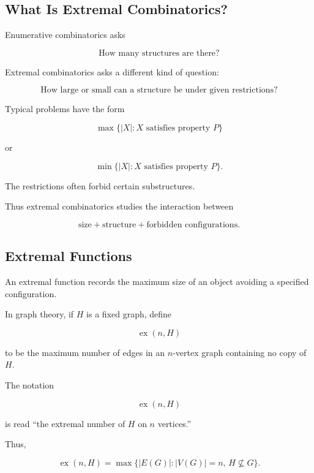 \subsection{What Is Extremal Combinatorics?}
\label{subsec:what-is-extremal-combinatorics}

Enumerative combinatorics asks

\[
\boxed{
\text{How many structures are there?}
}
\]

Extremal combinatorics asks a different kind of question:

\[
\boxed{
\text{How large or small can a structure be under given restrictions?}
}
\]

Typical problems have the form

\[
\boxed{
\max\{|X|:X\text{ satisfies property }P\}
}
\]

or

\[
\boxed{
\min\{|X|:X\text{ satisfies property }P\}.
}
\]

The restrictions often forbid certain substructures.

Thus extremal combinatorics studies the interaction between

\[
\boxed{
\text{size}
+
\text{structure}
+
\text{forbidden configurations}.
}
\]

\subsection{Extremal Functions}
\label{subsec:extremal-functions}

An extremal function records the maximum size of an object avoiding a
specified configuration.

In graph theory, if \(H\) is a fixed graph, define

\[
\boxed{
\operatorname{ex}(n,H)
}
\]

to be the maximum number of edges in an \(n\)-vertex graph containing no
copy of \(H\).

The notation

\[
\operatorname{ex}(n,H)
\]

is read ``the extremal number of \(H\) on \(n\) vertices.''

Thus,

\[
\boxed{
\operatorname{ex}(n,H)
=
\max\{
|E(G)|:
|V(G)|=n,\,
H\not\subseteq G
\}.
}
\]

